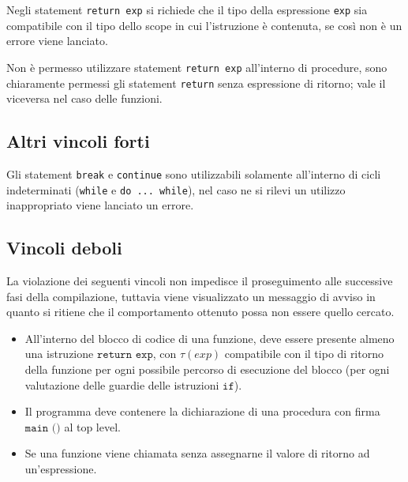 Negli statement \texttt{return exp} si richiede che il tipo della espressione \texttt{exp} sia compatibile con il tipo dello scope in cui l'istruzione è contenuta, se così non è un errore viene lanciato.

Non è permesso utilizzare statement \texttt{return exp} all'interno di procedure, sono chiaramente permessi gli statement \texttt{return} senza espressione di ritorno; vale il viceversa nel caso delle funzioni.

\subsection*{Altri vincoli forti}
Gli statement \texttt{break} e \texttt{continue} sono utilizzabili solamente all'interno di cicli indeterminati (\texttt{while} e \texttt{do ... while}), nel caso ne si rilevi un utilizzo inappropriato viene lanciato un errore.

\subsection*{Vincoli deboli}
La violazione dei seguenti vincoli non impedisce il proseguimento alle successive fasi della compilazione, tuttavia viene visualizzato un messaggio di avviso in quanto si ritiene che il comportamento ottenuto possa non essere quello cercato.

\begin{itemize}
	\item All'interno del blocco di codice di una funzione, deve essere presente almeno una istruzione $\texttt{return exp}$, con $\tau(exp)$ compatibile con il tipo di ritorno della funzione per ogni possibile percorso di esecuzione del blocco (per ogni valutazione delle guardie delle istruzioni $\texttt{if}$).
	\item Il programma deve contenere la dichiarazione di una procedura con firma $\texttt{main ()}$ al top level.
	\item Se una funzione viene chiamata senza assegnarne il valore di ritorno ad un'espressione.
\end{itemize}